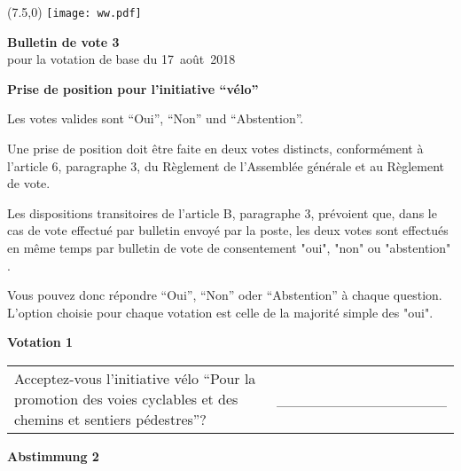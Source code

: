 \documentclass[11pt, a4paper]{scrartcl}
\begin{document}
{\begin{minipage}[t][12.5cm][t]{17.7cm}
\end{minipage}

\newpage

\begin{minipage}[t][12.5cm][t]{17.7cm}

\begin{textblock}{6}(7.5,0)
\texttt{[image: ww.pdf]}
\end{textblock}

{\LARGE\textbf{Bulletin de vote 3}} \\
pour la votation de base du 17~août~2018 \\

\vspace{2cm}

\textbf{Prise de position pour l'initiative \enquote{vélo}}

\vspace{0.1cm}
Les votes valides sont \enquote{Oui}, \enquote{Non} und \enquote{Abstention}.

\vspace{0.1cm}
Une prise de position doit être faite en deux votes distincts, conformément à l'article 6, paragraphe 3, du Règlement de l'Assemblée générale et au Règlement de vote.

Les dispositions transitoires de l'article B, paragraphe 3, prévoient que, dans le cas de vote effectué par bulletin envoyé par la poste, les deux votes sont effectués en même temps par bulletin de vote de consentement "oui", "non" ou "abstention" .

\vspace{0.1cm}
Vous pouvez donc répondre \enquote{Oui}, \enquote{Non} oder \enquote{Abstention} à chaque question. L'option choisie pour chaque votation est celle de la majorité simple des "oui".

\vspace{1cm}

\textbf{Votation 1}

\vspace{0.5cm}

\begin{tabular}{ b{13.5cm} b{3cm} }
Acceptez-vous l'initiative vélo \enquote{Pour la promotion des voies cyclables et des chemins et sentiers pédestres}?
& \_\_\_\_\_\_\_\_\_\_\_\_\_\_\_\_ \\
\end{tabular}

\vspace{0.5cm}

\textbf{Abstimmung 2}


\end{minipage}}
\end{document}
